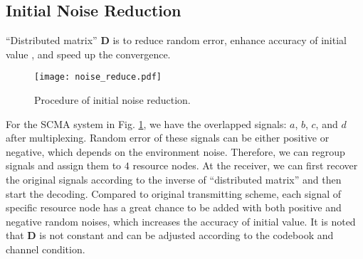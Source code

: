 \documentclass[journal,twoside]{IEEEtran}
\begin{document}
\subsection{Initial Noise Reduction}
``Distributed matrix'' $\mathbf{D}$ is to reduce random error, enhance accuracy of initial value \cite{forney1998modulation}, and speed up the convergence.
\begin{figure}[htbp]
\centering
\texttt{[image: noise\_reduce.pdf]}
\caption{\label{fig:noise_reduce}Procedure of initial noise reduction.}
\end{figure}

For the SCMA system in Fig. \ref{fig:noise_reduce}, we have the overlapped signals: $a$, $b$, $c$, and $d$ after multiplexing. Random error of these signals can be either positive or negative, which depends on the environment noise. Therefore, we can regroup signals and assign them to $4$ resource nodes. At the receiver, we can first recover the original signals according to the inverse of ``distributed matrix'' and then start the decoding. Compared to original transmitting scheme, each signal of specific resource node has a great chance to be added with both positive and negative random noises, which increases the accuracy of initial value. It is noted that $\mathbf{D}$ is not constant and can be adjusted according to the codebook and channel condition.
\end{document}
